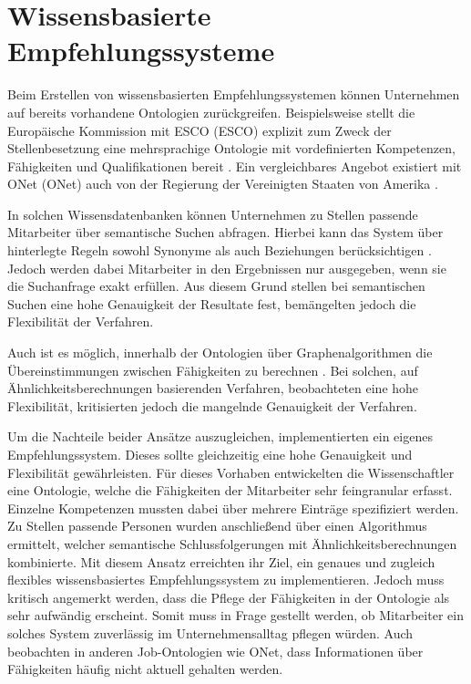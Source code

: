 \section{Wissensbasierte Empfehlungssysteme}
\label{ch:empfehlungssysteme:wissensbasierteAnsaetze}
Beim Erstellen von wissensbasierten Empfehlungssystemen können Unternehmen auf bereits vorhandene Ontologien zurückgreifen. Beispielsweise stellt die Europäische Kommission mit \acs{ESCO} (\acl{ESCO}) explizit zum Zweck der Stellenbesetzung eine mehrsprachige Ontologie mit vordefinierten Kompetenzen, Fähigkeiten und Qualifikationen bereit \cite[S. 1ff.]{leVrang:2014}. Ein vergleichbares Angebot existiert mit \acs{ONet} (\acl{ONet}) auch von der Regierung der Vereinigten Staaten von Amerika \cite[S. 2]{aCombinedRepresentation:2018}.

In solchen Wissensdatenbanken können Unternehmen zu Stellen passende Mitarbeiter über semantische Suchen abfragen. Hierbei kann das System über hinterlegte Regeln sowohl Synonyme als auch Beziehungen berücksichtigen \cite[S. 2f.]{singto:2013}. Jedoch werden dabei Mitarbeiter in den Ergebnissen nur ausgegeben, wenn sie die Suchanfrage exakt erfüllen. Aus diesem Grund stellen \textcite[S. 3]{bianchini:2008} bei semantischen Suchen eine hohe Genauigkeit der Resultate fest, bemängelten jedoch die Flexibilität der Verfahren.

Auch ist es möglich, innerhalb der Ontologien über Graphenalgorithmen die Übereinstimmungen zwischen Fähigkeiten zu berechnen \cite[S. 1f.]{balachander:2018}. Bei solchen, auf Ähnlichkeitsberechnungen basierenden Verfahren, beobachteten \textcite[S. 4]{bianchini:2008} eine hohe Flexibilität, kritisierten jedoch die mangelnde Genauigkeit der Verfahren.

Um die Nachteile beider Ansätze auszugleichen, implementierten \textcite[S. 4ff.]{semanticMatchmaking:2009} ein eigenes Empfehlungssystem. Dieses sollte gleichzeitig eine hohe Genauigkeit und Flexibilität gewährleisten. Für dieses Vorhaben entwickelten die Wissenschaftler eine Ontologie, welche die Fähigkeiten der Mitarbeiter sehr feingranular erfasst. Einzelne Kompetenzen mussten dabei über mehrere Einträge spezifiziert werden. Zu Stellen passende Personen wurden anschließend über einen Algorithmus ermittelt, welcher semantische Schlussfolgerungen mit Ähnlichkeitsberechnungen kombinierte. Mit diesem Ansatz erreichten \textcite[S. 11f.]{semanticMatchmaking:2009} ihr Ziel, ein genaues und zugleich flexibles wissensbasiertes Empfehlungssystem zu implementieren. Jedoch muss kritisch angemerkt werden, dass die Pflege der Fähigkeiten in der Ontologie als sehr aufwändig erscheint. Somit muss in Frage gestellt werden, ob Mitarbeiter ein solches System zuverlässig im Unternehmensalltag pflegen würden. Auch \textcite[S. 2]{aCombinedRepresentation:2018} beobachten in anderen Job-Ontologien wie \acs{ONet}, dass Informationen über Fähigkeiten häufig nicht aktuell gehalten werden.

